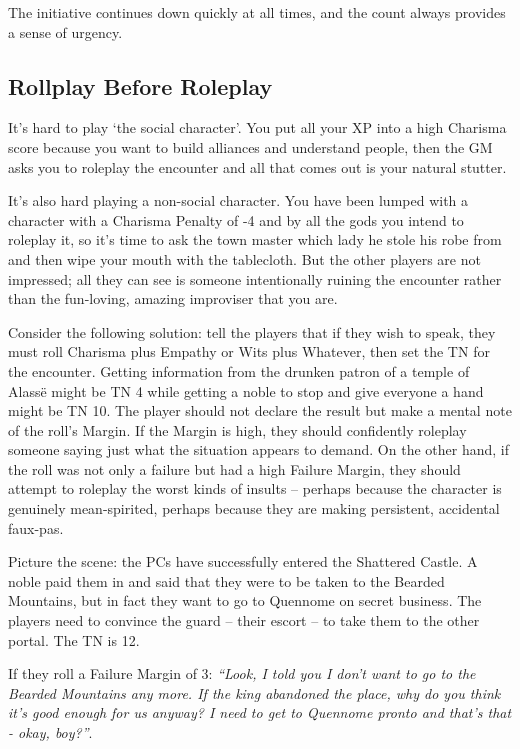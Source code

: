 The initiative continues down quickly at all times, and the count always provides a sense of urgency.

\subsection{Rollplay Before Roleplay}

It's hard to play `the social character'.  You put all your XP into a high Charisma score because you want to build alliances and understand people, then the GM asks you to roleplay the encounter and all that comes out is your natural stutter.

It's also hard playing a non-social character.  You have been lumped with a character with a Charisma Penalty of -4 and by all the gods you intend to roleplay it, so it's time to ask the town master which lady he stole his robe from and then wipe your mouth with the tablecloth.  But the other players are not impressed; all they can see is someone intentionally ruining the encounter rather than the fun-loving, amazing improviser that you are.

Consider the following solution: tell the players that if they wish to speak, they must roll Charisma plus Empathy or Wits plus Whatever, then set the TN for the encounter.  Getting information from the drunken patron of a temple of Alass\"{e} might be TN 4 while getting a noble to stop and give everyone a hand might be TN 10.  The player should not declare the result but make a mental note of the roll's Margin.  If the Margin is high, they should confidently roleplay someone saying just what the situation appears to demand.  On the other hand, if the roll was not only a failure but had a high Failure Margin, they should attempt to roleplay the worst kinds of insults -- perhaps because the character is genuinely mean-spirited, perhaps because they are making persistent, accidental faux-pas.

Picture the scene: the PCs have successfully entered the Shattered Castle.  A noble paid them in and said that they were to be taken to the Bearded Mountains, but in fact they want to go to Quennome on secret business.  The players need to convince the guard -- their escort -- to take them to the other portal.  The TN is 12.

If they roll a Failure Margin of 3: \textit{``Look, I told you I don't want to go to the Bearded Mountains any more.  If the king abandoned the place, why do you think it's good enough for us anyway?  I need to get to Quennome pronto and that's that - okay, boy?''}.

